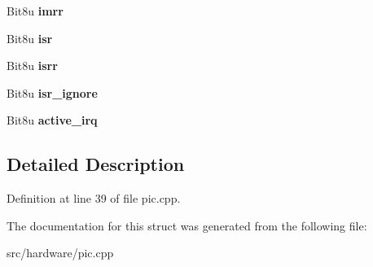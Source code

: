 \begin{DoxyCompactItemize}
\item 
\hypertarget{structPIC__Controller_a138308d81e33e95b85c37931a67427d0}{Bit8u {\bfseries imrr}}\label{structPIC__Controller_a138308d81e33e95b85c37931a67427d0}

\item 
\hypertarget{structPIC__Controller_a659d63dbd7cba92eed18a49421d94bec}{Bit8u {\bfseries isr}}\label{structPIC__Controller_a659d63dbd7cba92eed18a49421d94bec}

\item 
\hypertarget{structPIC__Controller_ae3d8234bf6bc4cb37b27e961fee92f72}{Bit8u {\bfseries isrr}}\label{structPIC__Controller_ae3d8234bf6bc4cb37b27e961fee92f72}

\item 
\hypertarget{structPIC__Controller_aad551e24a9c5ac8a7ab3d11f447e9053}{Bit8u {\bfseries isr\-\_\-ignore}}\label{structPIC__Controller_aad551e24a9c5ac8a7ab3d11f447e9053}

\item 
\hypertarget{structPIC__Controller_abbe151d9c4816820e6e8e2fb3f5c2b8f}{Bit8u {\bfseries active\-\_\-irq}}\label{structPIC__Controller_abbe151d9c4816820e6e8e2fb3f5c2b8f}

\end{DoxyCompactItemize}


\subsection{Detailed Description}


Definition at line 39 of file pic.\-cpp.



The documentation for this struct was generated from the following file\-:\begin{DoxyCompactItemize}
\item 
src/hardware/pic.\-cpp\end{DoxyCompactItemize}
